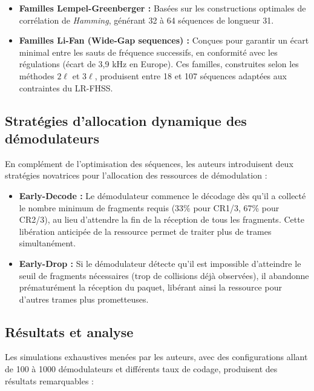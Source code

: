 \begin{itemize}
	\item \textbf{Familles Lempel-Greenberger :} Basées sur les constructions optimales de corrélation de \textit{Hamming}, générant 32 à 64 séquences de longueur 31.
	\item \textbf{Familles Li-Fan (Wide-Gap sequences) :} Conçues pour garantir un écart minimal entre les sauts de fréquence successifs, en conformité avec les régulations (écart de 3,9 kHz en Europe). Ces familles, construites selon les méthodes $2\ell$ et $3\ell$, produisent entre 18 et 107 séquences adaptées aux contraintes du LR-FHSS.
\end{itemize}

\subsection{Stratégies d'allocation dynamique des démodulateurs}

En complément de l'optimisation des séquences, les auteurs introduisent deux stratégies novatrices pour l'allocation des ressources de démodulation :

\begin{itemize}
	\item \textbf{Early-Decode :} Le démodulateur commence le décodage dès qu'il a collecté le nombre minimum de fragments requis (33\% pour CR1/3, 67\% pour CR2/3), au lieu d'attendre la fin de la réception de tous les fragments. Cette libération anticipée de la ressource permet de traiter plus de trames simultanément.
	
	\item \textbf{Early-Drop :} Si le démodulateur détecte qu'il est impossible d'atteindre le seuil de fragments nécessaires (trop de collisions déjà observées), il abandonne prématurément la réception du paquet, libérant ainsi la ressource pour d'autres trames plus prometteuses.
\end{itemize}

\subsection{Résultats et analyse}

Les simulations exhaustives menées par les auteurs, avec des configurations allant de 100 à 1000 démodulateurs et différents taux de codage, produisent des résultats remarquables :

